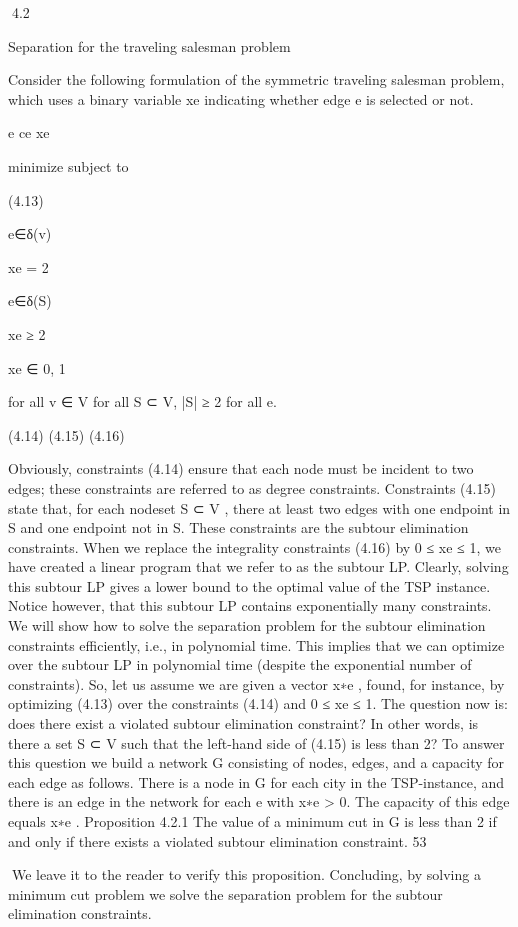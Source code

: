 4.2

Separation for the traveling salesman problem

Consider the following formulation of the symmetric traveling salesman problem, which uses a binary
variable xe indicating whether edge e is selected or not.

e ce xe

minimize
subject to

(4.13)

e∈δ(v)

xe = 2

e∈δ(S)

xe ≥ 2

xe ∈ {0, 1}

for all v ∈ V
for all S ⊂ V, |S| ≥ 2
for all e.

(4.14)
(4.15)
(4.16)

Obviously, constraints (4.14) ensure that each node must be incident to two edges; these constraints are
referred to as degree constraints. Constraints (4.15) state that, for each nodeset S ⊂ V , there at least two
edges with one endpoint in S and one endpoint not in S. These constraints are the subtour elimination
constraints.
When we replace the integrality constraints (4.16) by 0 ≤ xe ≤ 1, we have created a linear program that
we refer to as the subtour LP. Clearly, solving this subtour LP gives a lower bound to the optimal value
of the TSP instance. Notice however, that this subtour LP contains exponentially many constraints. We
will show how to solve the separation problem for the subtour elimination constraints efficiently, i.e., in
polynomial time. This implies that we can optimize over the subtour LP in polynomial time (despite the
exponential number of constraints).
So, let us assume we are given a vector x∗e , found, for instance, by optimizing (4.13) over the constraints
(4.14) and 0 ≤ xe ≤ 1. The question now is: does there exist a violated subtour elimination constraint?
In other words, is there a set S ⊂ V such that the left-hand side of (4.15) is less than 2? To answer this
question we build a network G consisting of nodes, edges, and a capacity for each edge as follows. There
is a node in G for each city in the TSP-instance, and there is an edge in the network for each e with
x∗e > 0. The capacity of this edge equals x∗e .
Proposition 4.2.1 The value of a minimum cut in G is less than 2 if and only if there exists a violated
subtour elimination constraint.
53

We leave it to the reader to verify this proposition. Concluding, by solving a minimum cut problem we
solve the separation problem for the subtour elimination constraints.

